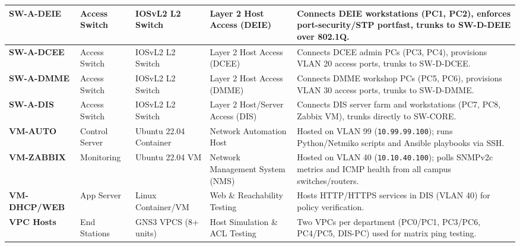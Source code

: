 \documentclass[11pt,a4paper]{article}
\begin{document}
\begin{table}[htbp]
\begin{tabularx}{\textwidth}{@{}l p{1.3cm} p{1.8cm} p{2.4cm} L@{}}
\midrule
\textbf{SW-A-DEIE} & Access Switch & IOSvL2 L2 Switch & Layer 2 Host Access (DEIE) & Connects DEIE workstations (PC1, PC2), enforces port-security/STP portfast, trunks to SW-D-DEIE over 802.1Q. \\
\midrule
\textbf{SW-A-DCEE} & Access Switch & IOSvL2 L2 Switch & Layer 2 Host Access (DCEE) & Connects DCEE admin PCs (PC3, PC4), provisions VLAN 20 access ports, trunks to SW-D-DCEE. \\
\midrule
\textbf{SW-A-DMME} & Access Switch & IOSvL2 L2 Switch & Layer 2 Host Access (DMME) & Connects DMME workshop PCs (PC5, PC6), provisions VLAN 30 access ports, trunks to SW-D-DMME. \\
\midrule
\textbf{SW-A-DIS} & Access Switch & IOSvL2 L2 Switch & Layer 2 Host/Server Access (DIS) & Connects DIS server farm and workstations (PC7, PC8, Zabbix VM), trunks directly to SW-CORE. \\
\midrule
\textbf{VM-AUTO} & Control Server & Ubuntu 22.04 Container & Network Automation Host & Hosted on VLAN 99 (\texttt{10.99.99.100}); runs Python/Netmiko scripts and Ansible playbooks via SSH. \\
\midrule
\textbf{VM-ZABBIX} & Monitoring & Ubuntu 22.04 VM & Network Management System (NMS) & Hosted on VLAN 40 (\texttt{10.10.40.100}); polls SNMPv2c metrics and ICMP health from all campus switches/routers. \\
\midrule
\textbf{VM-DHCP/WEB} & App Server & Linux Container/VM & Web \& Reachability Testing & Hosts HTTP/HTTPS services in DIS (VLAN 40) for policy verification. \\
\midrule
\textbf{VPC Hosts} & End Stations & GNS3 VPCS (8+ units) & Host Simulation \& ACL Testing & Two VPCs per department (PC0/PC1, PC3/PC6, PC4/PC5, DIS-PC) used for matrix ping testing. \\
\bottomrule
\end{tabularx}
\end{table}
\end{document}
